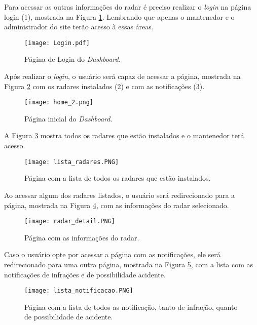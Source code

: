 Para acessar as outras informações do radar é preciso realizar o \textit{login} na página login (1), mostrada na Figura \ref{login}. Lembrando que apenas o mantenedor e o administrador do site terão acesso à essas áreas. 

  \begin{figure}[H]
     \centering
     \texttt{[image: Login.pdf]}
     \caption{Página de Login do \textit{Dashboard}.}
     \label{login}
 \end{figure}
 
 Após realizar o \textit{login}, o usuário será capaz de acessar a página, mostrada na Figura \ref{home_2} com os radares instalados (2) e com as notificações (3).
 
   \begin{figure}[H]
     \centering
     \texttt{[image: home\_2.png]}
     \caption{Página inicial do \textit{Dashboard}.}
     \label{home_2}
 \end{figure}

A Figura \ref{radares} mostra todos os radares que estão instalados e o mantenedor terá acesso.

   \begin{figure}[H]
     \centering
     \texttt{[image: lista\_radares.PNG]}
     \caption{Página com a lista de todos os radares que estão instalados.}
     \label{radares}
 \end{figure}
 
 Ao acessar algum dos radares listados, o usuário será redirecionado para a página, mostrada na Figura \ref{radar_detail}, com as informações do radar selecionado.
 
    \begin{figure}[H]
     \centering
     \texttt{[image: radar\_detail.PNG]}
     \caption{Página com as informações do radar.}
     \label{radar_detail}
 \end{figure}

Caso o usuário opte por acessar a página com as notificações, ele será redirecionado para uma outra página, mostrada na Figura \ref{lista_notificacao}, com a lista com as notificações de infrações e de possibilidade acidente.

    \begin{figure}[H]
     \centering
     \texttt{[image: lista\_notificacao.PNG]}
     \caption{Página com a lista de todos as notificação, tanto de infração, quanto de possibilidade de acidente.}
     \label{lista_notificacao}
 \end{figure}
 
